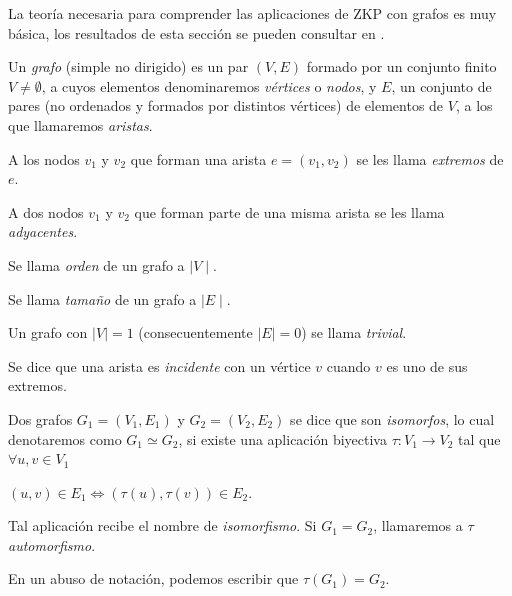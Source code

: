La teoría necesaria para comprender las aplicaciones de ZKP con grafos es muy básica, los resultados de esta sección se pueden consultar en \citep{grafosyOD}.

\begin{definition}
	Un \textit{grafo} (simple no dirigido) es un par $(V,E)$ formado por un conjunto finito $V \neq \emptyset$, a cuyos elementos denominaremos \textit{vértices} o \textit{nodos}, y $E$, un conjunto de pares (no ordenados y formados por distintos vértices) de elementos de $V$, a los que llamaremos \textit{aristas}.
	
	A los nodos $v_1$ y $v_2$ que forman una arista $e = (v_1, v_2)$ se les llama \textit{extremos} de $e$.
\end{definition}


\begin{definition}[Conceptos]
	\hfil
	
	A dos nodos $v_1$ y $v_2$ que forman parte de una misma arista se les llama \textit{adyacentes}.
	
	Se llama \textit{orden} de un grafo a $\mid V \mid $.
	
	Se llama \textit{tamaño} de un grafo a $\mid E \mid $.
	
	Un grafo con $ \mid V \mid = 1$ (consecuentemente $\mid E \mid = 0$) se llama \textit{trivial}.
	
	Se dice que una arista es \textit{incidente} con un vértice $v$ cuando $v$ es uno de sus extremos.
\end{definition}



\begin{definition}
	Dos grafos $G_1 = (V_1, E_1)$ y $G_2 = (V_2, E_2)$ se dice que son \textit{isomorfos}, lo cual denotaremos como $G_1 \simeq G_2$, si existe una aplicación biyectiva $\tau : V_1 \rightarrow V_2$ tal que $\forall u,v \in V_1$
	
	\begin{center}
		$(u,v) \in E_1 \Leftrightarrow (\tau(u), \tau(v)) \in E_2 $.
	\end{center}
	
	Tal aplicación recibe el nombre de \textit{isomorfismo}. Si $G_1 = G_2$, llamaremos a $\tau$ \textit{automorfismo}.
\end{definition}

En un abuso de notación, podemos escribir que $\tau(G_1) = G_2$.


